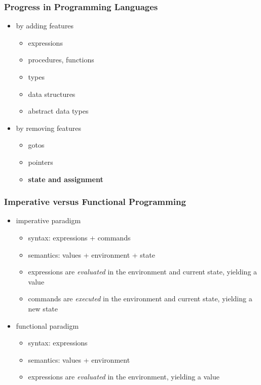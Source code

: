 \begin{multicols}{2}
\subsubsection{Progress in Programming Languages}
\begin{itemize}
  \item by adding features
  \begin{itemize}
    \item expressions
    \item procedures, functions
    \item types
    \item data structures
    \item abstract data types
  \end{itemize}
  \item by removing features
  \begin{itemize}
    \item gotos
    \item pointers
    \item \textbf{state and assignment}
  \end{itemize}
\end{itemize}

\subsubsection{Imperative versus Functional Programming}
\begin{itemize}
  \item imperative paradigm
  \begin{itemize}
    \item syntax: expressions + commands
    \item semantics: values + environment + state
    \item expressions are \textit{evaluated} in the environment and current state, yielding a value
    \item commands are \textit{executed} in the environment and current state, yielding a new state
  \end{itemize}
  \item functional paradigm
  \begin{itemize}
    \item syntax: expressions
    \item semantics: values + environment
    \item expressions are \textit{evaluated} in the environment, yielding a value
  \end{itemize}
\end{itemize}


\end{multicols}
